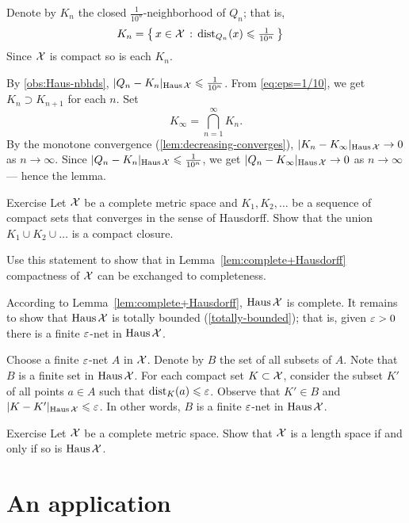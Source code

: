 Denote by $K_n$ the closed $\tfrac1{10^n}$-neighborhood of $Q_n$;
that is,
\begin{align*}
K_n&= \left\{\,{x\in \mathcal{X}}\,:\,{\mathrm{dist}_{Q_n}(x)\leqslant \tfrac1{10^n}}\,\right\}
\end{align*}
Since $\mathcal{X}$ is compact so is each $K_n$.

By \ref{obs:Haus-nbhds}, $|Q_n-K_n|_{\operatorname{\rm Haus}\nolimits\mathcal{X}}\leqslant \tfrac1{10^n}$.
From \ref{eq:eps=1/10}, we get
$K_n\supset K_{n+1}$ 
for each $n$.
Set 
$$K_\infty=\bigcap_{n=1}^\infty K_n.$$
By the monotone convergence (\ref{lem:decreasing-converges}),
 $|K_n-K_\infty|_{\operatorname{\rm Haus}\nolimits\mathcal{X}}\to 0$ as $n\to\infty$.
Since $|Q_n-K_n|_{\operatorname{\rm Haus}\nolimits\mathcal{X}}\leqslant \tfrac1{10^n}$, we get $|Q_n-K_\infty|_{\operatorname{\rm Haus}\nolimits\mathcal{X}}\to 0$ as $n\to\infty$ --- hence the lemma.
\qeds

\begin{thm}{Exercise}\label{ex:closure-union}
Let $\mathcal{X}$ be a complete metric space and $K_1,K_2,\dots$ be a sequence of compact sets 
that converges in the sense of Hausdorff.
Show that the union $K_1\cup K_2\cup\dots$ is a compact closure.

Use this statement to show that in Lemma~\ref{lem:complete+Hausdorff} compactness of $\mathcal{X}$ can be exchanged to completeness.
\end{thm}

According to Lemma~\ref{lem:complete+Hausdorff},
$\operatorname{\rm Haus}\nolimits\mathcal{X}$ is complete.
It remains to show that $\operatorname{\rm Haus}\nolimits\mathcal{X}$ is totally bounded (\ref{totally-bounded});
that is, given $\varepsilon>0$ there is a finite $\varepsilon$-net in $\operatorname{\rm Haus}\nolimits\mathcal{X}$.

Choose a finite $\varepsilon$-net $A$ in $\mathcal{X}$.
Denote by $B$ the set of all subsets of $A$.
Note that  $B$ is a finite set in $\operatorname{\rm Haus}\nolimits\mathcal{X}$.
For each compact set $K\subset \mathcal{X}$, consider the subset $K'$ of all points $a\in A$
such that $\mathrm{dist}_K(a)\leqslant \varepsilon$.
Observe that $K' \in B$ and $|K-K'|_{\operatorname{\rm Haus}\nolimits\mathcal{X}}\leqslant\varepsilon$.
In other words, $B$ is a finite $\varepsilon$-net in $\operatorname{\rm Haus}\nolimits\mathcal{X}$.
\qeds

\begin{thm}{Exercise}\label{ex:Haus-length}
Let $\mathcal{X}$ be a complete metric space.
Show that $\mathcal{X}$ is a length space if and only if so is $\operatorname{\rm Haus}\nolimits\mathcal{X}$.
\end{thm}

\section{An application}

